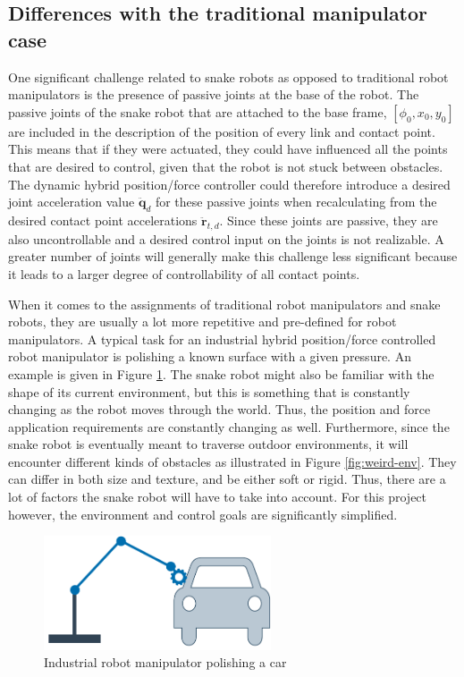 \subsection{Differences with the traditional manipulator case}

One significant challenge related to snake robots as opposed to traditional robot manipulators is the presence of passive joints at the base of the robot. The passive joints of the snake robot that are attached to the base frame, $[\phi_0, x_0, y_0]$ are included in the description of the position of every link and contact point. This means that if they were actuated, they could have influenced all the points that are desired to control, given that the robot is not stuck between obstacles. The dynamic hybrid position/force controller could therefore introduce a desired joint acceleration value $\ddot{\mathbf{q}}_d$ for these passive joints when recalculating from the desired contact point accelerations $\ddot{\mathbf{r}}_{t,d}$. Since these joints are passive, they are also uncontrollable and a desired control input on the joints is not realizable. A greater number of joints will generally make this challenge less significant because it leads to a larger degree of controllability of all contact points.

When it comes to the assignments of traditional robot manipulators and snake robots, they are usually a lot more repetitive and pre-defined for robot manipulators. A typical task for an industrial hybrid position/force controlled robot manipulator is polishing a known surface with a given pressure. An example is given in Figure \ref{fig:robotman-polish}. The snake robot might also be familiar with the shape of its current environment, but this is something that is constantly changing as the robot moves through the world. Thus, the position and force application requirements are constantly changing as well. Furthermore, since the snake robot is eventually meant to traverse outdoor environments, it will encounter different kinds of obstacles as illustrated in Figure \ref{fig:weird-env}. They can differ in both size and texture, and be either soft or rigid. Thus, there are a lot of factors the snake robot will have to take into account. For this project however, the environment and control goals are significantly simplified.

\begin{figure}
    \centering
    \includegraphics[width=0.6\textwidth]{figures/theory/robotman-polish.pdf}
    \caption{Industrial robot manipulator polishing a car}
    \label{fig:robotman-polish}
\end{figure}

